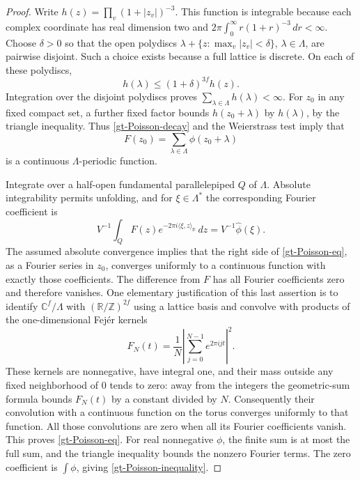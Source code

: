 \begin{proof}
Write $h(z)=\prod_v(1+|z_v|)^{-3}$.
This function is integrable because each complex coordinate has
real dimension two and
$2\pi\int_0^\infty r(1+r)^{-3}\,dr<\infty$.
Choose $\delta>0$ so that the open polydiscs
$\lambda+\{z:\max_v|z_v|<\delta\}$, $\lambda\in\Lambda$,
are pairwise disjoint.  Such a choice exists because a full
lattice is discrete.  On each of these polydiscs,
\[
 h(\lambda)\leq(1+\delta)^{3f}h(z).
\]
Integration over the disjoint polydiscs proves
$\sum_{\lambda\in\Lambda}h(\lambda)<\infty$.
For $z_0$ in any fixed compact set, a further fixed factor bounds
$h(z_0+\lambda)$ by $h(\lambda)$, by the triangle inequality.
Thus \eqref{gt-Poisson-decay} and the Weierstrass test imply that
\[
 F(z_0)=\sum_{\lambda\in\Lambda}\phi(z_0+\lambda)
\]
is a continuous $\Lambda$-periodic function.

Integrate over a half-open fundamental parallelepiped $Q$ of
$\Lambda$.  Absolute integrability permits unfolding, and for
$\xi\in\Lambda^*$ the corresponding Fourier coefficient is
\[
 V^{-1}\int_Q F(z)e^{-2\pi i\langle\xi,z\rangle_{\mathbb R}}\,dz
       =V^{-1}\widehat\phi(\xi).
\]
The assumed absolute convergence implies that the right side of
\eqref{gt-Poisson-eq}, as a Fourier series in $z_0$, converges
uniformly to a continuous function with exactly those
coefficients.  The difference from $F$ has all Fourier
coefficients zero and therefore vanishes.  One elementary
justification of this last assertion is to identify
$\mathbb C^f/\Lambda$ with
$(\mathbb R/\mathbb Z)^{2f}$ using a lattice basis and convolve
with products of the one-dimensional Fej\'er kernels
\[
 F_N(t)=\frac1N\left|\sum_{j=0}^{N-1}e^{2\pi ijt}\right|^2.
\]
These kernels are nonnegative, have integral one, and their
mass outside any fixed neighborhood of $0$ tends to zero:
away from the integers the geometric-sum formula bounds
$F_N(t)$ by a constant divided by $N$.
Consequently their convolution with a continuous function on
the torus converges uniformly to that function.
All those convolutions are zero when all its Fourier
coefficients vanish.  This proves \eqref{gt-Poisson-eq}.
For real nonnegative $\phi$, the finite sum is at most the full
sum, and the triangle inequality bounds the nonzero Fourier
terms.  The zero coefficient is $\int\phi$, giving
\eqref{gt-Poisson-inequality}.
\end{proof}

